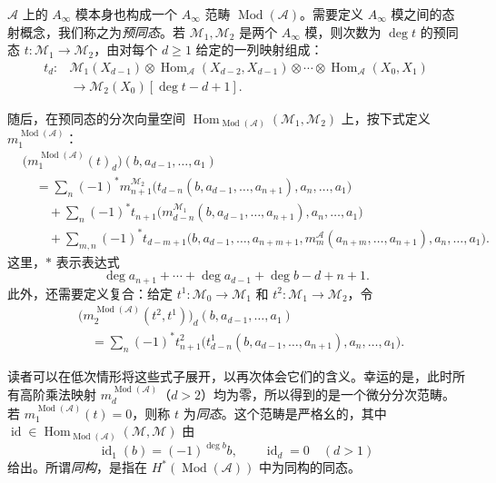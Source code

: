 $\mathcal A$ 上的 $A_\infty$ 模本身也构成一个 $A_\infty$ 范畴 $\operatorname{Mod}(\mathcal A)$。需要定义 $A_\infty$ 模之间的态射概念，我们称之为\emph{预同态}。若 $\mathcal M_1,\mathcal M_2$ 是两个 $A_\infty$ 模，则次数为 $\deg t$ 的预同态 $t\colon\mathcal M_1\to\mathcal M_2$，由对每个 $d\geq1$ 给定的一列映射组成：
\setcounter{equation}{9}
\begin{equation}\label{eq:8.10}
\begin{aligned}
t_d\colon{}&\mathcal M_1(X_{d-1})\otimes
\operatorname{Hom}_{\mathcal A}(X_{d-2},X_{d-1})\otimes\cdots
\otimes\operatorname{Hom}_{\mathcal A}(X_0,X_1)\\
&\longrightarrow\mathcal M_2(X_0)[\deg t-d+1].
\end{aligned}
\end{equation}

随后，在预同态的分次向量空间 $\operatorname{Hom}_{\operatorname{Mod}(\mathcal A)}(\mathcal M_1,\mathcal M_2)$ 上，按下式定义 $m_1^{\operatorname{Mod}(\mathcal A)}$：
\[
\begin{aligned}
&\bigl(m_1^{\operatorname{Mod}(\mathcal A)}(t)_d\bigr)(b,a_{d-1},\ldots,a_1)\\
&\quad=\sum_n(-1)^*m_{n+1}^{\mathcal M_2}
\bigl(t_{d-n}(b,a_{d-1},\ldots,a_{n+1}),a_n,\ldots,a_1\bigr)\\
&\qquad+\sum_n(-1)^*t_{n+1}
\bigl(m_{d-n}^{\mathcal M_1}(b,a_{d-1},\ldots,a_{n+1}),a_n,\ldots,a_1\bigr)\\
&\qquad+\sum_{m,n}(-1)^*t_{d-m+1}
\bigl(b,a_{d-1},\ldots,a_{n+m+1},
m_m^{\mathcal A}(a_{n+m},\ldots,a_{n+1}),a_n,\ldots,a_1\bigr).
\end{aligned}
\]
这里，$*$ 表示表达式
\[
\deg a_{n+1}+\cdots+\deg a_{d-1}+\deg b-d+n+1.
\]
此外，还需要定义复合：给定 $t^1\colon\mathcal M_0\to\mathcal M_1$ 和 $t^2\colon\mathcal M_1\to\mathcal M_2$，令
\[
\begin{aligned}
&\bigl(m_2^{\operatorname{Mod}(\mathcal A)}(t^2,t^1)\bigr)_d
(b,a_{d-1},\ldots,a_1)\\
&\quad=\sum_n(-1)^*t^2_{n+1}
\bigl(t^1_{d-n}(b,a_{d-1},\ldots,a_{n+1}),a_n,\ldots,a_1\bigr).
\end{aligned}
\]

读者可以在低次情形将这些式子展开，以再次体会它们的含义。幸运的是，此时所有高阶乘法映射 $m_d^{\operatorname{Mod}(\mathcal A)}$（$d>2$）均为零，所以得到的是一个微分分次范畴。若 $m_1^{\operatorname{Mod}(\mathcal A)}(t)=0$，则称 $t$ 为\emph{同态}。这个范畴是严格幺的，其中 $\operatorname{id}\in\operatorname{Hom}_{\operatorname{Mod}(\mathcal A)}(\mathcal M,\mathcal M)$ 由
\[
\operatorname{id}_1(b)=(-1)^{\deg b}b,\qquad
\operatorname{id}_d=0\quad(d>1)
\]
给出。所谓\emph{同构}，是指在 $H^*(\operatorname{Mod}(\mathcal A))$ 中为同构的同态。

